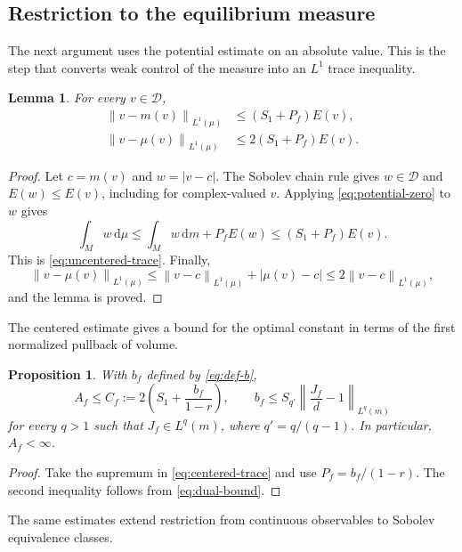 \documentclass[10pt,a4paper]{amsart}
\newtheorem{proposition}[theorem]{Proposition}
\newtheorem{lemma}[theorem]{Lemma}
\newcommand{\Dcal}{\mathcal D}
\newcommand{\norm}[1]{\left\lVert #1\right\rVert}
\newcommand{\dd}{\mathrm d}
\numberwithin{equation}{section}
\begin{document}
\subsection{Restriction to the equilibrium measure}

The next argument uses the potential estimate on an absolute value. This is the step that converts weak control of the measure into an $L^1$ trace inequality.

\begin{lemma}\label{lem:trace}
For every $v\in\Dcal$,
\begin{align}
 \norm{v-m(v)}_{L^1(\mu)}&\le (S_1+P_f)E(v),\label{eq:uncentered-trace}\\
 \norm{v-\mu(v)}_{L^1(\mu)}&\le 2(S_1+P_f)E(v).\label{eq:centered-trace}
\end{align}
\end{lemma}

\begin{proof}
Let $c=m(v)$ and $w=|v-c|$. The Sobolev chain rule gives $w\in\Dcal$ and $E(w)\le E(v)$, including for complex-valued $v$. Applying \eqref{eq:potential-zero} to $w$ gives
\[
 \int_Mw\,\dd\mu
 \le\int_Mw\,\dd m+P_fE(w)
 \le(S_1+P_f)E(v).
\]
This is \eqref{eq:uncentered-trace}. Finally,
\[
 \norm{v-\mu(v)}_{L^1(\mu)}
 \le\norm{v-c}_{L^1(\mu)}+|\mu(v)-c|
 \le2\norm{v-c}_{L^1(\mu)},
\]
and the lemma is proved.
\end{proof}

The centered estimate gives a bound for the optimal constant in terms of the first normalized pullback of volume.

\begin{proposition}\label{prop:prefactor-bound}
With $b_f$ defined by \eqref{eq:def-b},
\begin{equation}\label{eq:main-constant}
 A_f\le C_f:=2\left(S_1+\frac{b_f}{1-r}\right),
 \qquad
 b_f\le S_{q'}\norm{\frac{J_f}{d}-1}_{L^q(m)}
\end{equation}
for every $q>1$ such that $J_f\in L^q(m)$, where $q'=q/(q-1)$. In particular, $A_f<\infty$.
\end{proposition}

\begin{proof}
Take the supremum in \eqref{eq:centered-trace} and use $P_f=b_f/(1-r)$. The second inequality follows from \eqref{eq:dual-bound}.
\end{proof}

The same estimates extend restriction from continuous observables to Sobolev equivalence classes.
\end{document}
